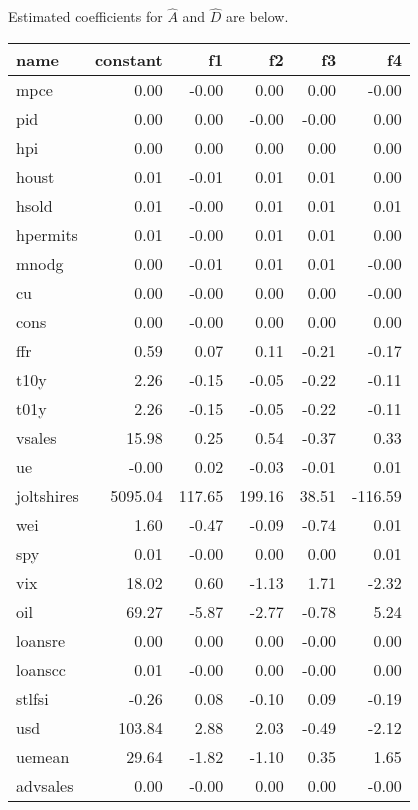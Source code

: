 \documentclass[11pt, letterpaper]{article}\usepackage[]{graphicx}\usepackage[]{color}
\begin{document}
Estimated coefficients for $\widehat{A}$ and $\widehat{D}$ are below.
\begin{table}[H]
\centering
\begingroup\footnotesize
\begin{tabular}{lrrrrr}
  \hline
name & constant & f1 & f2 & f3 & f4 \\ 
  \hline
mpce & 0.00 & -0.00 & 0.00 & 0.00 & -0.00 \\ 
  pid & 0.00 & 0.00 & -0.00 & -0.00 & 0.00 \\ 
  hpi & 0.00 & 0.00 & 0.00 & 0.00 & 0.00 \\ 
  houst & 0.01 & -0.01 & 0.01 & 0.01 & 0.00 \\ 
  hsold & 0.01 & -0.00 & 0.01 & 0.01 & 0.01 \\ 
  hpermits & 0.01 & -0.00 & 0.01 & 0.01 & 0.00 \\ 
  mnodg & 0.00 & -0.01 & 0.01 & 0.01 & -0.00 \\ 
  cu & 0.00 & -0.00 & 0.00 & 0.00 & -0.00 \\ 
  cons & 0.00 & -0.00 & 0.00 & 0.00 & 0.00 \\ 
  ffr & 0.59 & 0.07 & 0.11 & -0.21 & -0.17 \\ 
  t10y & 2.26 & -0.15 & -0.05 & -0.22 & -0.11 \\ 
  t01y & 2.26 & -0.15 & -0.05 & -0.22 & -0.11 \\ 
  vsales & 15.98 & 0.25 & 0.54 & -0.37 & 0.33 \\ 
  ue & -0.00 & 0.02 & -0.03 & -0.01 & 0.01 \\ 
  joltshires & 5095.04 & 117.65 & 199.16 & 38.51 & -116.59 \\ 
  wei & 1.60 & -0.47 & -0.09 & -0.74 & 0.01 \\ 
  spy & 0.01 & -0.00 & 0.00 & 0.00 & 0.01 \\ 
  vix & 18.02 & 0.60 & -1.13 & 1.71 & -2.32 \\ 
  oil & 69.27 & -5.87 & -2.77 & -0.78 & 5.24 \\ 
  loansre & 0.00 & 0.00 & 0.00 & -0.00 & 0.00 \\ 
  loanscc & 0.01 & -0.00 & 0.00 & -0.00 & 0.00 \\ 
  stlfsi & -0.26 & 0.08 & -0.10 & 0.09 & -0.19 \\ 
  usd & 103.84 & 2.88 & 2.03 & -0.49 & -2.12 \\ 
  uemean & 29.64 & -1.82 & -1.10 & 0.35 & 1.65 \\ 
  advsales & 0.00 & -0.00 & 0.00 & 0.00 & -0.00 \\ 

\end{tabular}
\end{table}
\end{document}
